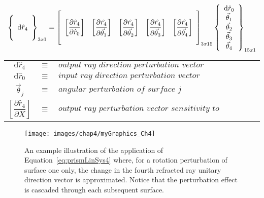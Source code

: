 \begin{table}		%
\centering
\begin{equation}		%
\label{eq:prismLinSys4}
\left \{
	\begin{array}{c}
	\hspace{5mm} \\
	\textrm{d}\hat{r}_{4} \\
	\hspace{5mm}
	\end{array}
\right \}_{3x1} = 
\left [
	\begin{array}{ccccc}
	\hspace{5mm} \\
	\left [ \dfrac{\partial\hat{r}_4}{\partial\hat{r}_0} \right ] & 
	\left [ \dfrac{\partial\hat{r_4}}{\partial\vec{\theta}_1} \right ] & 
	\left [ \dfrac{\partial\hat{r_4}}{\partial\vec{\theta}_2} \right ] & 
	\left [ \dfrac{\partial\hat{r_4}}{\partial\vec{\theta}_3} \right ] & 
	\left [ \dfrac{\partial\hat{r_4}}{\partial\vec{\theta}_4} \right ] \\
	\hspace{5mm}
	\end{array}
\right ]_{3x15}
\left \{
	\begin{array}{c}
	\textrm{d}\hat{r}_{0} \\
	\vec{\theta}_{1} \\
	\vec{\theta}_{2} \\
	\vec{\theta}_{3} \\
	\vec{\theta}_{4}
	\end{array}
\right \}_{15x1}
\end{equation}
\begin{tabular}{cll}
$\textrm{d}\hat{r}_{4}$ & $\equiv$ & $\textit{output ray direction perturbation vector}$ \\
$\textrm{d}\hat{r}_{0}$  & $\equiv$ & $\textit{input ray direction perturbation vector}$ \\
$\vec{\theta}_{j}$  & $\equiv$ & $\textit{angular perturbation of surface j}$ \\
$\left [ \dfrac{\partial\hat{r}_4}{\partial X} \right ]$  & $\equiv$ & $\textit{output ray perturbation vector sensitivity to perturbation X}$ \\
\end{tabular}
\end{table}

\begin{figure}[htb]		%
\centering
\texttt{[image: images/chap4/myGraphics\_Ch4]}
\caption{An example illustration of the application of Equation~\eqref{eq:prismLinSys4} where, for a rotation perturbation of surface one only, the change in the fourth refracted ray unitary direction vector is approximated. Notice that the perturbation effect is cascaded through each subsequent surface.}
\label{fig:appliedEqn}
\end{figure}

